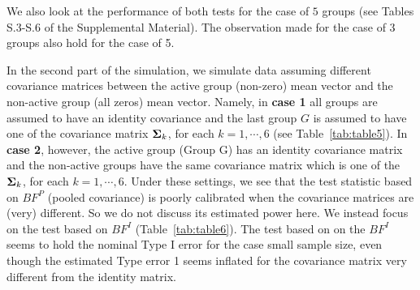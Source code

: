 \documentclass[12pt]{article}
\theoremstyle{plain}%
\theoremstyle{definition}
\newcommand{\uSigma}            {\mbox{\boldmath$\Sigma$}}
\begin{document}
We also look at the performance of both tests for the case of $5$ groups (see Tables S.3-S.6 of the Supplemental Material). The observation made for the case of 3 groups also hold for the case of 5.

In the second part of the simulation, we simulate data assuming different covariance matrices between the active group (non-zero) mean vector and the non-active group (all zeros) mean vector. Namely, in {\bf case 1} all groups are assumed to have an identity covariance and the last group $G$ is assumed to have one of the  covariance matrix $\uSigma_k$, for each $k = 1, \cdots, 6$ (see Table~\ref{tab:table5}). 
In {\bf case 2}, however, the active group (Group G) has an identity  covariance matrix and the  non-active groups have the same covariance matrix which is one of the $\uSigma_k$, for each $k = 1, \cdots, 6$. Under these settings, we see that the test statistic based on $BF^{P}$ (pooled covariance) is poorly calibrated when the covariance matrices are (very) different. So we do not discuss its estimated power here. We instead focus on the test based on $BF^{I}$ (Table~\ref{tab:table6}). The test based on on the $BF^{I}$ seems to hold the nominal Type I error for the case small sample size, even though the estimated Type error 1 seems inflated for the covariance matrix very different from the identity matrix.
\end{document}
